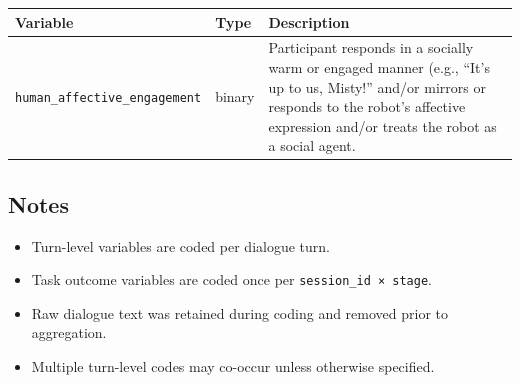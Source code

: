 \documentclass[
  letterpaper,
  DIV=11,
  numbers=noendperiod]{scrartcl}
\providecommand{\tightlist}{%
  \setlength{\itemsep}{0pt}\setlength{\parskip}{0pt}}
\begin{document}
\begin{longtable}[]{@{}
  >{\raggedright\arraybackslash}p{}
  >{\raggedright\arraybackslash}p{}
  >{\raggedright\arraybackslash}p{}@{}}
\toprule\noalign{}
\begin{minipage}[b]{\linewidth}\raggedright
Variable
\end{minipage} & \begin{minipage}[b]{\linewidth}\raggedright
Type
\end{minipage} & \begin{minipage}[b]{\linewidth}\raggedright
Description
\end{minipage} \\
\midrule\noalign{}
\endhead
\bottomrule\noalign{}
\endlastfoot
\texttt{human\_affective\_engagement} & binary & Participant responds in
a socially warm or engaged manner (e.g., ``It's up to us, Misty!''
and/or mirrors or responds to the robot's affective expression and/or
treats the robot as a social agent. \\
\end{longtable}

\subsection{Notes}\label{notes}

\begin{itemize}
\tightlist
\item
  Turn-level variables are coded per dialogue turn.
\item
  Task outcome variables are coded once per
  \texttt{session\_id\ ×\ stage}.
\item
  Raw dialogue text was retained during coding and removed prior to
  aggregation.
\item
  Multiple turn-level codes may co-occur unless otherwise specified.
\end{itemize}
\end{document}
